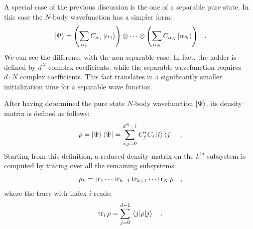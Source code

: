 \documentclass[pra, onecolumn, notitlepage, floats, 11pt]{revtex4-1}
\begin{document}
A special case of the previous discussion is the one of a separable pure state. In this case the \( N \)-body wavefunction has a simpler form:
\begin{equation}
    \ket{\Psi}
    =
    \qty(\sum_{\alpha_{1}} C_{\alpha_{1}} \ket{\alpha_{1}})
    \otimes
    \cdots
    \otimes
    \qty(\sum_{\alpha_{N}} C_{\alpha_{N}} \ket{\alpha_{N}})
    \quad
    .
    \label{eq:08_T_3}
\end{equation}
We can see the difference with the non-separable case. In fact, the ladder is defined by \( d^{N} \) complex coefficients, while the separable wavefunction requires \( d \cdot N \) complex coefficients. This fact translates in a significantly smaller initialization time for a separable wave function.

After having determined the pure state \( N \)-body wavefunction \( \ket{\Psi} \), its density matrix is defined as follows:
\begin{equation}
    \rho
    =
    \ket{\Psi} \bra{\Psi}
    =
    \sum_{i,j=0}^{d^{N}-1} C^{*}_{j} C_{i} \ket{i} \bra{j}
    \quad .
    \label{eq:08_T_4}
\end{equation}
Starting from this definition, a reduced density matrix on the \( k^{\text{th}} \) subsystem is computed by tracing over all the remaining subsystems:
\begin{equation}
    \rho_{k}
    =
    \tr_{1} \cdots \tr_{k-1} \tr_{k+1} \cdots \tr_{N} \rho
    \quad ,
    \label{eq:08_T_5}
\end{equation}
where the trace with index \( i \) reads:
\begin{equation}
    \tr_{i} \rho
    =
    \sum_{j=0}^{d-1} \expval{\rho}{j}
    \quad .
    \label{eq:08_T_6}
\end{equation}
\end{document}
